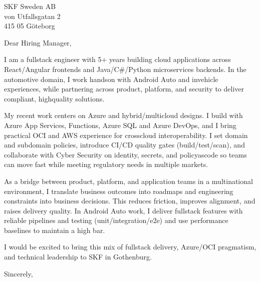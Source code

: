 \documentclass[a4paper,10pt]{letter}
\begin{document}
\pagestyle{empty}
\begin{letter}{SKF Sweden AB\\von Utfallsgatan 2\\415 05 G\"{o}teborg}
\opening{Dear Hiring Manager,}

I am a full\-stack engineer with 5+ years building cloud applications across React/Angular frontends and Java/C\#/Python microservices backends. In the automotive domain, I work hands\-on with Android Auto and in\-vehicle experiences, while partnering across product, platform, and security to deliver compliant, high\-quality solutions.

My recent work centers on Azure and hybrid/multi\-cloud designs. I build with Azure App Services, Functions, Azure SQL and Azure DevOps, and I bring practical OCI and AWS experience for cross\-cloud interoperability. I set domain and sub\-domain policies, introduce CI/CD quality gates (build/test/scan), and collaborate with Cyber Security on identity, secrets, and policy\-as\-code so teams can move fast while meeting regulatory needs in multiple markets.

As a bridge between product, platform, and application teams in a multi\-national environment, I translate business outcomes into roadmaps and engineering constraints into business decisions. This reduces friction, improves alignment, and raises delivery quality. In Android Auto work, I deliver full\-stack features with reliable pipelines and testing (unit/integration/e2e) and use performance baselines to maintain a high bar.

I would be excited to bring this mix of full\-stack delivery, Azure/OCI pragmatism, and technical leadership to SKF in Gothenburg.

\closing{Sincerely,}
\signature{Hongzhi Li\\Ebbe Lieberathsgatan 27\\412 65 G\"{o}teborg\\hongzhili01@gmail.com\\0728384299\\2025.09.12}
\end{letter}
\end{document}
